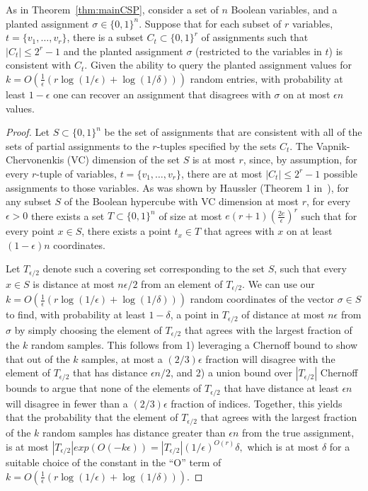 \documentclass[final,12pt]{colt2018}
\newcommand{\eps}{\epsilon}
\begin{document}
\begin{proposition}\label{prop:vc}
As in Theorem~\ref{thm:mainCSP}, consider a set of $n$ Boolean variables, and a planted assignment $\sigma\in \{0,1\}^n.$  Suppose that for each subset of $r$ variables, $t=\{v_1,\ldots,v_r\}$, there is a subset $C_t \subset \{0,1\}^r$ of assignments such that $|C_t| \le 2^r -1$ and the planted assignment $\sigma$ (restricted to the variables in $t$) is consistent with $C_t$.   Given the ability to query the planted assignment values for $k=O\left(\frac{1}{\eps}\left(r \log(1/\eps)+\log(1/\delta)\right)\right)$ random entries, with probability at least $1-\eps$ one can recover an assignment that disagrees with $\sigma$ on at most $\eps n$ values.
\end{proposition}
\begin{proof}%
Let $S\subset \{0,1\}^n$ be the set of assignments that are consistent with all of the sets of partial assignments to the $r$-tuples specified by the sets $C_t$.  The Vapnik-Chervonenkis (VC) dimension of the set $S$ is at most $r$, since, by assumption, for every $r$-tuple of variables,  $t=\{v_1,\ldots,v_r\}$, there are at most $|C_t| \le 2^{r}-1$ possible assignments to those variables.     As was shown by Haussler (Theorem 1 in~\citep{haussler1995sphere}), for any subset $S$ of the Boolean hypercube with VC dimension at most $r$, for every $\eps>0$ there exists a set $T \subset \{0,1\}^n$ of size at most $e(r+1)\left(\frac{2e}{\eps}\right)^r$ such that for every point $x \in S$, there exists a point $t_x \in T$ that agrees with $x$ on at least $(1-\eps)n$ coordinates.    

Let $T_{\eps/2}$ denote such a covering set corresponding to the set $S$, such that every $x \in S$ is distance at most $n\eps/2$ from an element of $T_{\eps/2}$.  We can use our $k = O\left(\frac{1}{\eps}\left(r \log(1/\eps)+\log(1/\delta)\right)\right)$ random coordinates of the vector $\sigma \in S$ to find, with probability at least $1-\delta$, a point in $T_{\eps/2}$ of distance at most $n\eps$ from $\sigma$ by simply choosing the element of $T_{\eps/2}$ that agrees with the largest fraction of the $k$ random samples.  This follows from 1) leveraging a Chernoff bound to show that out of the $k$ samples, at most a $(2/3) \eps$ fraction will disagree with the element of $T_{\eps/2}$ that has distance $\eps n /2$, and 2) a union bound over $|T_{\eps/2}|$ Chernoff bounds to argue that none of the elements of $T_{\eps/2}$ that have distance at least $\eps n$ will disagree in fewer than a $(2/3) \eps$ fraction of indices.  Together, this yields that the probability that the element of $T_{\eps/2}$ that agrees with the largest fraction of the $k$ random samples has distance greater than $\eps n$ from the true assignment, is at most $|T_{\eps/2}|exp(O(-k \eps)) = |T_{\eps/2}| (1/\eps)^{O(r)} \delta,$ which is at most $\delta$ for a suitable choice of the constant in the ``O'' term of $k=O\left(\frac{1}{\eps}\left(r \log(1/\eps)+\log(1/\delta)\right)\right)$.
\end{proof}
\end{document}
